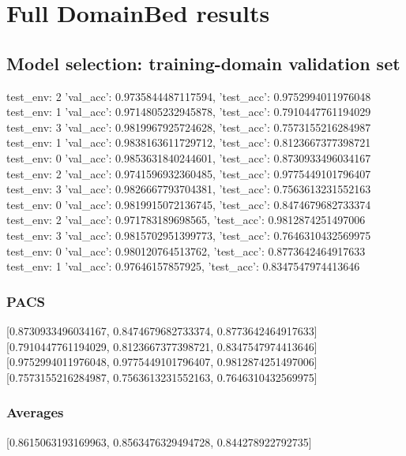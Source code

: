 \documentclass{article}
\begin{document}
\section{Full DomainBed results}

\subsection{Model selection: training-domain validation set}
test_env: 2
{'val_acc': 0.9735844487117594, 'test_acc': 0.9752994011976048}
test_env: 1
{'val_acc': 0.9714805232945878, 'test_acc': 0.7910447761194029}
test_env: 3
{'val_acc': 0.9819967925724628, 'test_acc': 0.7573155216284987}
test_env: 1
{'val_acc': 0.9838163611729712, 'test_acc': 0.8123667377398721}
test_env: 0
{'val_acc': 0.9853631840244601, 'test_acc': 0.8730933496034167}
test_env: 2
{'val_acc': 0.9741596932360485, 'test_acc': 0.9775449101796407}
test_env: 3
{'val_acc': 0.9826667793704381, 'test_acc': 0.7563613231552163}
test_env: 0
{'val_acc': 0.9819915072136745, 'test_acc': 0.8474679682733374}
test_env: 2
{'val_acc': 0.971783189698565, 'test_acc': 0.9812874251497006}
test_env: 3
{'val_acc': 0.9815702951399773, 'test_acc': 0.7646310432569975}
test_env: 0
{'val_acc': 0.980120764513762, 'test_acc': 0.8773642464917633}
test_env: 1
{'val_acc': 0.97646157857925, 'test_acc': 0.8347547974413646}

\subsubsection{PACS}
[0.8730933496034167, 0.8474679682733374, 0.8773642464917633]
[0.7910447761194029, 0.8123667377398721, 0.8347547974413646]
[0.9752994011976048, 0.9775449101796407, 0.9812874251497006]
[0.7573155216284987, 0.7563613231552163, 0.7646310432569975]

\begin{center}
\end{center}

\subsubsection{Averages}
[0.8615063193169963, 0.8563476329494728, 0.844278922792735]

\begin{center}
\end{center}
\end{document}
